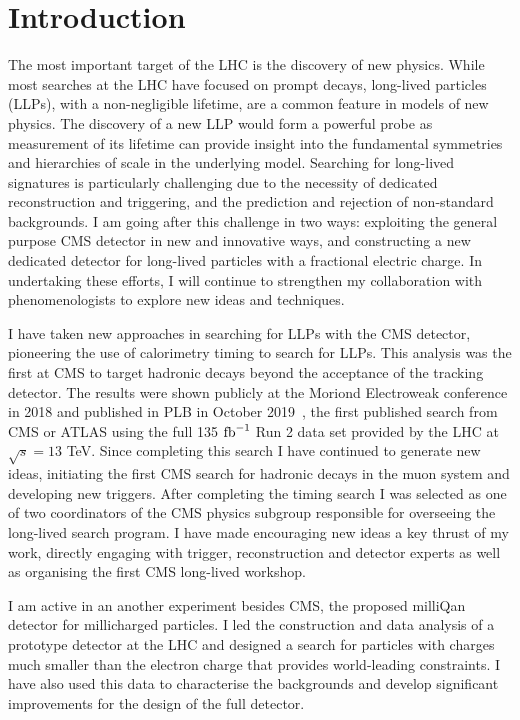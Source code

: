\documentclass[11pt,a4paper]{article}
\theoremstyle{plain} \numberwithin{equation}{section}
\theoremstyle{definition}
\DeclareRobustCommand{\ifb}{$\rm{fb}^{-1}~$}
\begin{document}
\section*{Introduction}

The most important target of the LHC is the discovery of new physics.
While most searches at the LHC have focused on prompt decays,
long-lived particles (LLPs), with a non-negligible lifetime, are a common feature in models of 
new physics. The discovery of a new LLP would form a powerful probe as measurement 
of its lifetime can provide insight into the fundamental symmetries
and hierarchies of scale in the underlying model.
Searching for long-lived signatures is particularly 
challenging due to the necessity of dedicated reconstruction 
and triggering, and the prediction and rejection of non-standard backgrounds. 
I am going after this challenge in two ways: exploiting
the general purpose CMS detector in new and innovative ways,
and constructing a new dedicated detector for long-lived particles
with a fractional electric charge.
In undertaking these efforts, I will continue to strengthen my collaboration
with phenomenologists to explore new ideas and techniques.

I have taken new approaches in searching for LLPs with
the CMS detector, pioneering the use of calorimetry timing 
to search for LLPs.
This analysis was the first at CMS to target hadronic decays 
beyond the acceptance of the tracking 
detector. The results were shown publicly at the Moriond Electroweak 
conference in 2018 and published 
in PLB in October 2019~\cite{2019134876}, 
the first published search from CMS or ATLAS using the 
full 135 \ifb Run 2 data set provided by the LHC at $\sqrt{s} = 13$ TeV. 
Since completing this search I have continued to generate new ideas,
initiating the first CMS search for hadronic decays in the muon system
and developing new triggers. After completing the timing search I was selected as one of two 
coordinators of the CMS physics subgroup responsible for overseeing
the long-lived search program. I have made encouraging 
new ideas a key thrust of my work, directly engaging with
trigger, reconstruction and detector experts as well as organising the 
first CMS long-lived workshop. 

I am active in an another experiment besides CMS, the proposed milliQan
detector for millicharged particles. I led the 
construction and data analysis of a prototype detector
at the LHC and designed a search 
for particles with charges much smaller than the electron charge
that provides world-leading constraints. I have also used this data to 
characterise the backgrounds and 
develop significant improvements for the design of the full detector.
\end{document}
